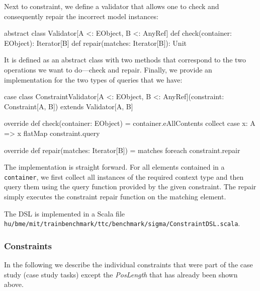 Next to constraint, we define a validator that allows one to check and consequently repair the incorrect model instances:
%
\begin{scalacode}
abstract class Validator[A <: EObject, B <: AnyRef] {
  def check(container: EObject): Iterator[B]
  def repair(matches: Iterator[B]): Unit
}
\end{scalacode}
%
It is defined as an abstract class with two methods that correspond to the two operations we want to do---\Ie check and repair.
Finally, we provide an implementation for the two types of queries that we have:
%
\begin{scalacode}
case class ConstraintValidator[A <: EObject, B <: AnyRef](constraint: Constraint[A, B]) 
  extends Validator[A, B] {
  
  override def check(container: EObject) =
    container.eAllContents collect { case x: A => x } flatMap constraint.query

  override def repair(matches: Iterator[B]) = 
    matches foreach constraint.repair
}
\end{scalacode}
%
The implementation is straight forward.
For all elements contained in a \texttt{container}, we first collect all instances of the required context type and then query them using the query function provided by the given constraint.
The repair simply executes the constraint repair function on the matching element.

The DSL is implemented in a Scala file \texttt{hu/bme/mit/trainbenchmark/ttc/benchmark/sigma/ConstraintDSL.scala}.

\subsubsection{Constraints}

In the following we describe the individual constraints that were part of the case study (case study tasks) except the \emph{PosLength} that has already been shown above.

